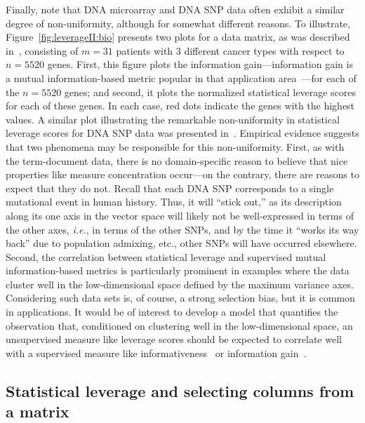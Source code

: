 \documentclass[twoside]{article}
\begin{document}
Finally, note that DNA microarray and DNA SNP data often exhibit a similar 
degree of non-uniformity, although for somewhat different reasons.
To illustrate, Figure~\ref{fig:leverageII:bio} presents two plots for a data 
matrix, as was described in~\cite{CUR_PNAS}, consisting of $m = 31$ patients 
with $3$ different cancer types with respect to $n = 5520$ genes. 
First, this figure plots the information gain---information gain is a mutual 
information-based metric popular in that application 
area~\cite{Paschou07b,CUR_PNAS}---for each of the $n = 5520$ genes; and
second, it plots the normalized statistical leverage scores for each of 
these genes.
In each case, red dots indicate the genes with the highest values.
A similar plot illustrating the remarkable non-uniformity in statistical 
leverage scores for DNA SNP data was presented in~\cite{Paschou07b}.
Empirical evidence suggests that two phenomena may be responsible for this 
non-uniformity.
First, as with the term-document data, there is no domain-specific reason to 
believe that nice properties like measure concentration occur---on the 
contrary, there are reasons to expect that they do not.
Recall that each DNA SNP corresponds to a single mutational event in human 
history.
Thus, it will ``stick out,'' as its description along its one axis in the 
vector space will likely not be well-expressed in terms of the other axes, 
\emph{i.e.}, in terms of the other SNPs, and by the time it ``works its way 
back'' due to population admixing, etc., other SNPs will have occurred 
elsewhere.
Second, the correlation between statistical leverage and supervised mutual 
information-based metrics is particularly prominent in examples where the 
data cluster well in the low-dimensional space defined by the maximum 
variance axes.
Considering such data sets is, of course, a strong selection bias, but it is 
common in applications.
It would be of interest to develop a model that quantifies the observation
that, conditioned on clustering well in the low-dimensional space, an 
unsupervised measure like leverage scores should be expected to correlate 
well with a supervised measure like informativeness~\cite{Paschou07b} or
information gain~\cite{CUR_PNAS}.


\subsection{Statistical leverage and selecting columns from a matrix} 
\label{sxn:empirical-cssp}
\end{document}
